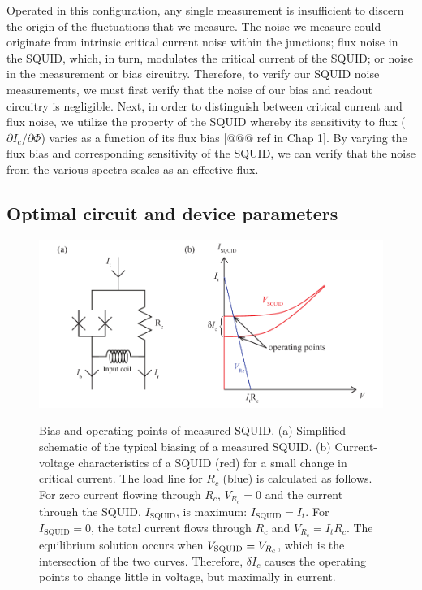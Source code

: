 Operated in this configuration, any single measurement is insufficient to discern the origin of the fluctuations that we measure. The noise we measure could originate from intrinsic critical current noise within the junctions; flux noise in the SQUID, which, in turn, modulates the critical current of the SQUID; or noise in the measurement or bias circuitry. Therefore, to verify our SQUID noise measurements, we must first verify that the noise of our bias and readout circuitry is negligible. Next, in order to distinguish between critical current and flux noise, we utilize the property of the SQUID whereby its sensitivity to flux ($\partial I_c/\partial\Phi$) varies as a function of its flux bias [@@@ ref in Chap 1]. By varying the flux bias and corresponding sensitivity of the SQUID, we can verify that the noise from the various spectra scales as an effective flux.

\subsection{Optimal circuit and device parameters}

\begin{figure}
\centering\includegraphics{experimental/Fig_loadline}\\
\caption[Bias and operating points of measured SQUID]{Bias and operating points of measured SQUID. (a) Simplified schematic of the typical biasing of a measured SQUID. (b) Current-voltage characteristics of a SQUID (red) for a small change in critical current. The load line for $R_c$ (blue) is calculated as follows. For zero current flowing through $R_c$, $V_{R_c} = 0$ and the current through the SQUID, $I_{\text{SQUID}}$, is maximum: $I_{\text{SQUID}} = I_t$. For $I_{\text{SQUID}} = 0$, the total current flows through $R_c$ and $V_{R_c} = I_t R_c$. The equilibrium solution occurs when $V_\text{SQUID} = V_{R_c}$, which is the intersection of the two curves. Therefore, $\delta I_c$ causes the operating points to change little in voltage, but maximally in current.}
\label{fig:experimental:loadline}
\end{figure}


